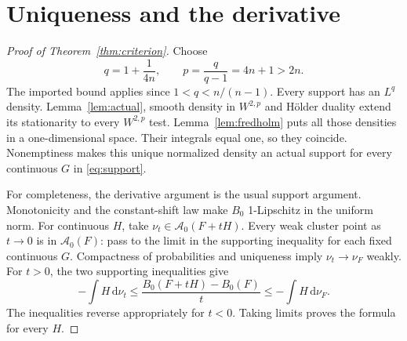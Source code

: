 \documentclass[11pt]{article}
\newcommand{\cA}{\mathcal A}
\theoremstyle{remark}
\begin{document}
\section{Uniqueness and the derivative}
\begin{proof}[Proof of Theorem~\ref{thm:criterion}]
Choose
\[
 q=1+\frac1{4n},\qquad p=\frac q{q-1}=4n+1>2n.
\]
The imported bound applies since $1<q<n/(n-1)$. Every support has an
$L^q$ density. Lemma~\ref{lem:actual}, smooth density in $W^{2,p}$ and
H\"older duality extend its stationarity to every $W^{2,p}$ test.
Lemma~\ref{lem:fredholm} puts all those densities in a one-dimensional
space. Their integrals equal one, so they coincide. Nonemptiness makes
this unique normalized density an actual support for every continuous
$G$ in \eqref{eq:support}.

For completeness, the derivative argument is the usual support argument.
Monotonicity and the constant-shift law make $B_0$ 1-Lipschitz in the
uniform norm. For continuous $H$, take $\nu_t\in\cA_0(F+tH)$.
Every weak cluster point as $t\to0$ is in $\cA_0(F)$: pass to the limit
in the supporting inequality for each fixed continuous $G$.
Compactness of probabilities and uniqueness imply $\nu_t\to\nu_F$
weakly. For $t>0$, the two supporting inequalities give
\[
 -\int H\,\mathrm d\nu_t
 \leq\frac{B_0(F+tH)-B_0(F)}t
 \leq-\int H\,\mathrm d\nu_F.
\]
The inequalities reverse appropriately for $t<0$. Taking limits proves
the formula for every $H$.
\end{proof}
\end{document}
